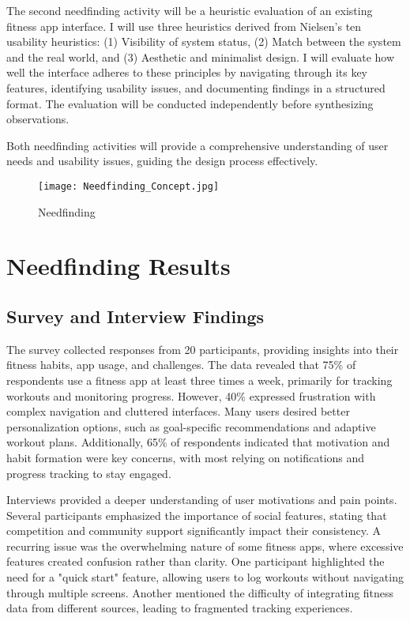 \documentclass[
	letterpaper, %
]{jdf}
\begin{document}
The second needfinding activity will be a heuristic evaluation of an existing fitness app interface. I will use three heuristics derived from Nielsen’s ten usability heuristics: (1) Visibility of system status, (2) Match between the system and the real world, and (3) Aesthetic and minimalist design. I will evaluate how well the interface adheres to these principles by navigating through its key features, identifying usability issues, and documenting findings in a structured format. The evaluation will be conducted independently before synthesizing observations.

Both needfinding activities will provide a comprehensive understanding of user needs and usability issues, guiding the design process effectively.

\begin{figure}
    \centering
    \texttt{[image: Needfinding\_Concept.jpg]}
    \caption{Needfinding}
    \label{fig:enter-label}
\end{figure}

\newpage

\section{Needfinding Results }
\subsection {Survey and Interview Findings}
The survey collected responses from 20 participants, providing insights into their fitness habits, app usage, and challenges. The data revealed that 75\% of respondents use a fitness app at least three times a week, primarily for tracking workouts and monitoring progress. However, 40\% expressed frustration with complex navigation and cluttered interfaces. Many users desired better personalization options, such as goal-specific recommendations and adaptive workout plans. Additionally, 65\% of respondents indicated that motivation and habit formation were key concerns, with most relying on notifications and progress tracking to stay engaged.

Interviews provided a deeper understanding of user motivations and pain points. Several participants emphasized the importance of social features, stating that competition and community support significantly impact their consistency. A recurring issue was the overwhelming nature of some fitness apps, where excessive features created confusion rather than clarity. One participant highlighted the need for a "quick start" feature, allowing users to log workouts without navigating through multiple screens. Another mentioned the difficulty of integrating fitness data from different sources, leading to fragmented tracking experiences.
\end{document}
